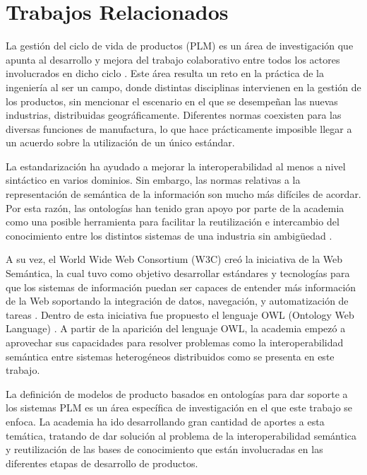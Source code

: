 \documentclass[journal]{IEEEtran}
\begin{document}
\section{Trabajos Relacionados}

La gesti\'on del ciclo de vida de productos (PLM) es un \'area de investigaci\'on que apunta al desarrollo y mejora del trabajo colaborativo entre todos los actores involucrados en dicho ciclo \cite{Terzi2010}. Este \'area resulta un reto en la pr\'actica de la ingenier\'ia al ser un campo, donde distintas disciplinas intervienen en la gesti\'on de los productos, sin mencionar el escenario en el que se desempe\~nan las nuevas industrias, distribuidas geogr\'aficamente. Diferentes normas coexisten para las diversas funciones de manufactura, lo que hace pr\'acticamente imposible llegar a un acuerdo sobre la utilizaci\'on de un \'unico est\'andar. 

La estandarizaci\'on ha ayudado a mejorar la interoperabilidad al menos a nivel sint\'actico en varios dominios. Sin embargo, las normas relativas a la representaci\'on de sem\'antica de la informaci\'on son mucho m\'as dif\'iciles de acordar. Por esta raz\'on, las ontolog\'ias han tenido gran apoyo por parte de la academia como una posible herramienta para facilitar la reutilizaci\'on e intercambio del conocimiento entre los distintos sistemas de una industria sin ambigüedad \cite{Guarino1998}.

A su vez, el World Wide Web Consortium (W3C) cre\'o la iniciativa de la Web Sem\'antica, la cual tuvo como objetivo desarrollar est\'andares y tecnolog\'ias para que los sistemas de informaci\'on puedan ser capaces de entender m\'as informaci\'on de la Web soportando la integraci\'on de datos, navegaci\'on, y automatizaci\'on de tareas \cite{koivunen2001w3c}. Dentro de esta iniciativa fue propuesto el lenguaje OWL (Ontology Web Language) \cite{mcguinness2004owl}. A partir de la aparici\'on del lenguaje OWL, la academia empez\'o a aprovechar sus capacidades para resolver problemas como la interoperabilidad sem\'antica entre sistemas heterog\'eneos distribuidos como se presenta en este trabajo.

La definici\'on de modelos de producto basados en ontolog\'ias para dar soporte a los sistemas PLM es un \'area espec\'ifica de investigaci\'on en el que este trabajo se enfoca. La academia ha ido desarrollando gran cantidad de aportes a esta tem\'atica, tratando de dar soluci\'on al problema de la interoperabilidad sem\'antica y reutilizaci\'on de las bases de conocimiento que est\'an involucradas en las diferentes etapas de desarrollo de productos.
\end{document}

